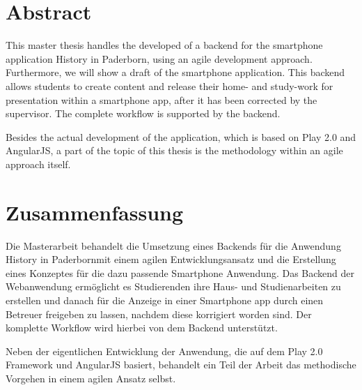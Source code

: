 \begingroup
\let\clearpage\relax
\let\cleardoublepage\relax
\let\cleardoublepage\relax

\chapter*{Abstract}
This master thesis handles the developed of a backend for the smartphone application \glqq History in Paderborn\grqq, using an agile development approach. Furthermore, we will show a draft of the smartphone application. This backend allows students to create content and release their home- and study-work for presentation within a smartphone app, after it has been corrected by the supervisor. The complete workflow is supported by the backend.

Besides the actual development of the application, which is based on Play 2.0 and AngularJS, a part of the topic of this thesis is the methodology within an agile approach itself.

\vfill

\chapter*{Zusammenfassung}
Die Masterarbeit behandelt die Umsetzung eines Backends f{\"u}r die Anwendung \glqq History in Paderborn\grqq mit einem agilen Entwicklungsansatz und die Erstellung eines Konzeptes f{\"u}r die dazu passende Smartphone Anwendung. Das Backend der Webanwendung erm{\"o}glicht es Studierenden ihre Haus- und Studienarbeiten zu erstellen und danach f{\"u}r die Anzeige in einer Smartphone app durch einen Betreuer freigeben zu lassen, nachdem diese korrigiert worden sind.  Der komplette Workflow wird hierbei von dem Backend unterst{\"u}tzt.

Neben der eigentlichen Entwicklung der Anwendung, die auf dem Play 2.0 Framework und AngularJS basiert, behandelt ein Teil der Arbeit das methodische Vorgehen in einem agilen Ansatz selbst.
\endgroup			

\vfill